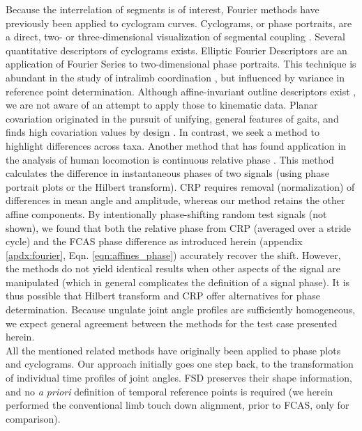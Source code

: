 \documentclass[10pt, a4paper]{article}
\begin{document}
\begin{linenumbers}[1]
Because the interrelation of segments is of interest, Fourier methods have previously been applied to cyclogram curves. 
Cyclograms, or phase portraits, are a direct, two- or three-dimensional visualization of segmental coupling \citep{Bernstein1934,Goswami1998,DAout2002}. 
Several quantitative descriptors of cyclograms exists. 
Elliptic Fourier Descriptors \citep{Kuhl1982,Wheat2006} are an application of Fourier Series to two-dimensional phase portraits. 
This technique is abundant in the study of intralimb coordination \citep[e.g.][]{Polk2008,HsiaoWecksler2010,Rosengren2009}, but influenced by variance in reference point determination. 
Although affine-invariant outline descriptors exist \citep[e.g.][]{Arbter1990}, we are not aware of an attempt to apply those to kinematic data. 
Planar covariation \citep{Borghese1996,Hallemans2009,Ogihara2014} originated in the pursuit of unifying, general features of gaits, and finds high covariation values by design \citep[choice of segment angles, common temporal swing/stance structure for these, use of PCA;][]{Hicheur2006,Ivanenko2008}. 
In contrast, we seek a method to highlight differences across taxa. 
Another method that has found application in the analysis of human locomotion is continuous relative phase \citep[CRP, \textit{cf.}][]{Lamb2014}. 
This method calculates the difference in instantaneous phases of two signals (using phase portrait plots or the Hilbert transform). 
CRP requires removal (normalization) of differences in mean angle and amplitude, whereas our method retains the other affine components. 
By intentionally phase-shifting random test signals (not shown), we found that both the relative phase from CRP (averaged over a stride cycle) and the FCAS phase difference as introduced herein (appendix \ref{apdx:fourier}, Eqn. \ref{eqn:affines_phase}) accurately recover the shift. 
However, the methods do not yield identical results when other aspects of the signal are manipulated (which in general complicates the definition of a signal phase). 
It is thus possible that Hilbert transform and CRP offer alternatives for phase determination. 
Because ungulate joint angle profiles are sufficiently homogeneous, we expect general agreement between the methods for the test case presented herein. 
\\All the mentioned related methods have originally been applied to phase plots and cyclograms. 
Our approach initially goes one step back, to the transformation of individual time profiles of joint angles. 
FSD preserves their shape information, and no \textit{a priori} definition of temporal reference points is required (we herein performed the conventional limb touch down alignment, prior to FCAS, only for comparison). 

\end{linenumbers}
\end{document}
